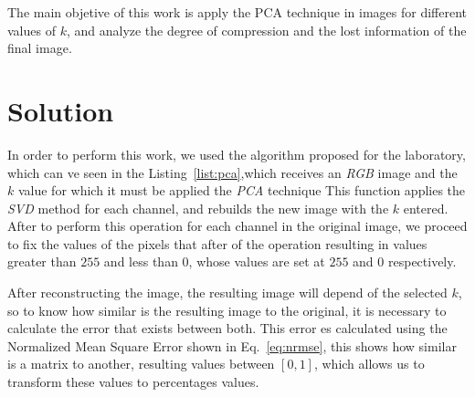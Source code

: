 \documentclass[journal]{IEEEtran}
\begin{document}
The main objetive of this work is apply the PCA technique in images for different values of $k$, and analyze the degree of compression and the lost information of the final image.

\section{Solution}
\label{sec:solution}


In order to perform this work, we used the algorithm proposed for the laboratory, which can ve seen in the Listing~\ref{list:pca},which receives an \textit{RGB} image and the $k$ value for which it must be applied the \textit{PCA} technique This function applies the \textit{SVD} method for each channel, and rebuilds the new image with the $k$ entered. After to perform this operation for each channel in the original image, we proceed to fix the values of the pixels that after of the operation resulting in values greater than $255$ and less than $0$, whose values are set at $255$ and $0$ respectively.


After reconstructing the image, the resulting image will depend of the selected $k$, so to know how similar is the resulting image to the original, it is necessary to calculate the error that exists between both. This error es calculated using the Normalized Mean Square Error shown in Eq.~\ref{eq:nrmse}, this shows how similar is a matrix to another, resulting values between $[0,1]$, which allows us to transform these values to percentages values.
\end{document}

